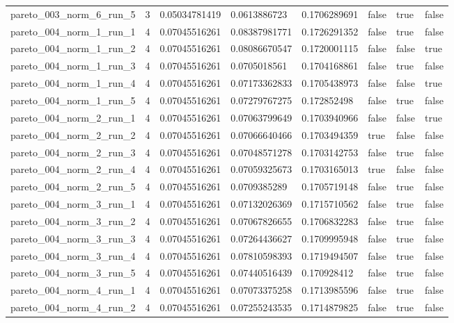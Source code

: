 \begin{tabular}{@{}llllllll@{}}
pareto\_003\_norm\_6\_run\_5 & 3 & 0.05034781419 & 0.0613886723 & 0.1706289691 & false & true & false \\
pareto\_004\_norm\_1\_run\_1 & 4 & 0.07045516261 & 0.08387981771 & 0.1726291352 & false & true & false \\
pareto\_004\_norm\_1\_run\_2 & 4 & 0.07045516261 & 0.08086670547 & 0.1720001115 & false & false & true \\
pareto\_004\_norm\_1\_run\_3 & 4 & 0.07045516261 & 0.0705018561 & 0.1704168861 & false & true & false \\
pareto\_004\_norm\_1\_run\_4 & 4 & 0.07045516261 & 0.07173362833 & 0.1705438973 & false & false & true \\
pareto\_004\_norm\_1\_run\_5 & 4 & 0.07045516261 & 0.07279767275 & 0.172852498 & false & true & false \\
pareto\_004\_norm\_2\_run\_1 & 4 & 0.07045516261 & 0.07063799649 & 0.1703940966 & false & false & true \\
pareto\_004\_norm\_2\_run\_2 & 4 & 0.07045516261 & 0.07066640466 & 0.1703494359 & true & false & false \\
pareto\_004\_norm\_2\_run\_3 & 4 & 0.07045516261 & 0.07048571278 & 0.1703142753 & false & true & false \\
pareto\_004\_norm\_2\_run\_4 & 4 & 0.07045516261 & 0.07059325673 & 0.1703165013 & true & false & false \\
pareto\_004\_norm\_2\_run\_5 & 4 & 0.07045516261 & 0.0709385289 & 0.1705719148 & false & true & false \\
pareto\_004\_norm\_3\_run\_1 & 4 & 0.07045516261 & 0.07132026369 & 0.1715710562 & false & true & false \\
pareto\_004\_norm\_3\_run\_2 & 4 & 0.07045516261 & 0.07067826655 & 0.1706832283 & false & true & false \\
pareto\_004\_norm\_3\_run\_3 & 4 & 0.07045516261 & 0.07264436627 & 0.1709995948 & false & true & false \\
pareto\_004\_norm\_3\_run\_4 & 4 & 0.07045516261 & 0.07810598393 & 0.1719494507 & false & true & false \\
pareto\_004\_norm\_3\_run\_5 & 4 & 0.07045516261 & 0.07440516439 & 0.170928412 & false & true & false \\
pareto\_004\_norm\_4\_run\_1 & 4 & 0.07045516261 & 0.07073375258 & 0.1713985596 & false & true & false \\
pareto\_004\_norm\_4\_run\_2 & 4 & 0.07045516261 & 0.07255243535 & 0.1714879825 & false & true & false \\

\end{tabular}
